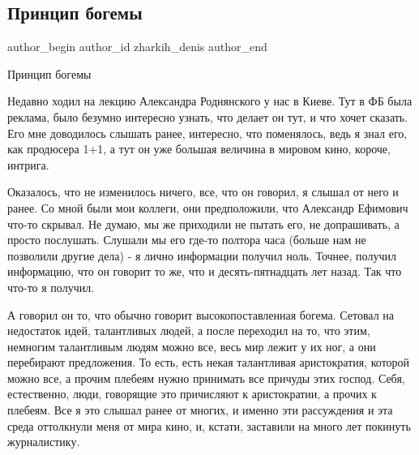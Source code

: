  
 
 
 
 
 
\subsection{Принцип богемы}
\label{sec:09_11_2021.fb.zharkih_denis.1.princip_bogemy}
 
\ifcmt
 author_begin
   author_id zharkih_denis
 author_end
\fi

Принцип богемы

Недавно ходил на лекцию Александра Роднянского у нас в Киеве. Тут в ФБ была
реклама, было безумно интересно узнать, что делает он тут, и что хочет сказать.
Его мне доводилось слышать ранее, интересно, что поменялось, ведь я знал его,
как продюсера 1+1, а тут он уже большая величина в мировом кино, короче,
интрига. 

Оказалось, что не изменилось ничего, все, что он говорил, я слышал от него и
ранее. Со мной были мои коллеги, они предположили, что Александр Ефимович
что-то скрывал. Не думаю, мы же приходили не пытать его, не допрашивать, а
просто послушать. Слушали мы его где-то полтора часа (больше нам не позволили
другие дела) - я лично информации получил ноль. Точнее, получил информацию, что
он говорит то же, что и десять-пятнадцать лет назад. Так что что-то я получил. 

А говорил он то, что обычно говорит высокопоставленная богема. Сетовал на
недостаток идей, талантливых людей, а после переходил на то, что этим, немногим
талантливым людям можно все, весь мир лежит у их ног, а они перебирают
предложения. То есть, есть некая талантливая аристократия, которой можно все, а
прочим плебеям нужно принимать все причуды этих господ. Себя, естественно,
люди, говорящие это причисляют к аристократии, а прочих к плебеям. Все я это
слышал ранее от многих, и именно эти рассуждения и эта среда оттолкнули меня от
мира кино, и, кстати, заставили на много лет покинуть журналистику. 

